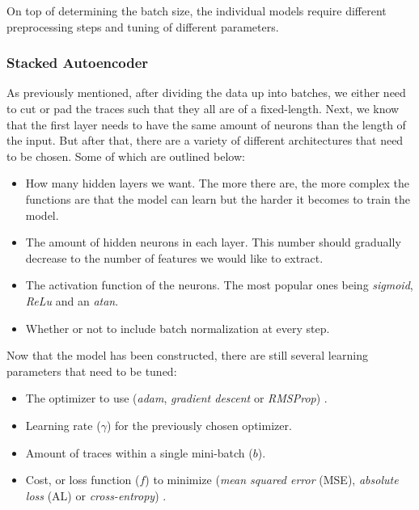 On top of determining the batch size, the individual models require different preprocessing steps and tuning of different parameters.

\subsubsection{Stacked Autoencoder}

As previously mentioned, after dividing the data up into batches, we either need to cut or pad the traces such that they all are of a fixed-length.
Next, we know that the first layer needs to have the same amount of neurons than the length of the input.
But after that, there are a variety of different architectures that need to be chosen.
Some of which are outlined below:

\newpage

\begin{itemize}
  \item How many hidden layers we want.
    The more there are, the more complex the functions are that the model can learn but the harder it becomes to train the model.

  \item The amount of hidden neurons in each layer.
    This number should gradually decrease to the number of features we would like to extract.

  \item The activation function of the neurons.
    The most popular ones being \textit{sigmoid}, \textit{ReLu} and an \textit{atan}.

  \item Whether or not to include batch normalization at every step.
\end{itemize}

Now that the model has been constructed, there are still several learning parameters that need to be tuned:

\begin{itemize}
    \item The optimizer to use (\textit{adam}, \textit{gradient descent} or \textit{RMSProp}) \cite{tensorflow}.
    \item Learning rate ($\gamma$) for the previously chosen optimizer.
    \item Amount of traces within a single mini-batch ($b$).
    \item Cost, or loss function ($f$) to minimize (\textit{mean squared error} (MSE), \textit{absolute loss} (AL) or \textit{cross-entropy}) \cite{tensorflow}.
\end{itemize}

